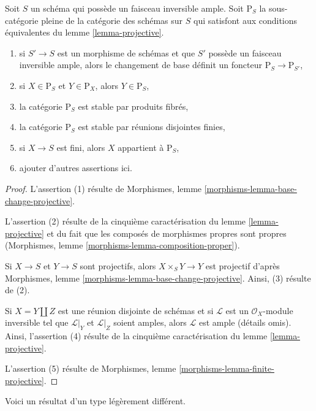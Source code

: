 \begin{lemma}
\label{lemma-category-projective}
Soit $S$ un schéma qui possède un faisceau inversible ample.
Soit $\text{P}_S$ la sous-catégorie pleine de la
catégorie des schémas sur $S$ qui satisfont aux conditions
équivalentes du lemme \ref{lemma-projective}.
\begin{enumerate}
\item si $S' \to S$ est un morphisme de schémas et que $S'$ possède
un faisceau inversible ample, alors le changement de base définit
un foncteur $\text{P}_S \to \text{P}_{S'}$,
\item si $X \in \text{P}_S$ et $Y \in \text{P}_X$, alors $Y \in \text{P}_S$,
\item la catégorie $\text{P}_S$ est stable par produits fibrés,
\item la catégorie $\text{P}_S$ est stable par
réunions disjointes finies,
\item si $X \to S$ est fini, alors $X$ appartient à $\text{P}_S$,
\item ajouter d'autres assertions ici.
\end{enumerate}
\end{lemma}

\begin{proof}
L'assertion (1) résulte de Morphismes, lemme
\ref{morphisms-lemma-base-change-projective}.

\medskip\noindent
L'assertion (2) résulte de la cinquième caractérisation du
lemme \ref{lemma-projective} et du fait que les composés
de morphismes propres sont propres
(Morphismes, lemme \ref{morphisms-lemma-composition-proper}).

\medskip\noindent
Si $X \to S$ et $Y \to S$ sont projectifs, alors
$X \times_S Y \to Y$ est projectif d'après
Morphismes, lemme \ref{morphisms-lemma-base-change-projective}.
Ainsi, (3) résulte de (2).

\medskip\noindent
Si $X = Y \amalg Z$ est une réunion disjointe de schémas
et si $\mathcal{L}$ est un $\mathcal{O}_X$-module inversible
tel que $\mathcal{L}|_Y$ et $\mathcal{L}|_Z$ soient amples, alors
$\mathcal{L}$ est ample (détails omis). Ainsi,
l'assertion (4) résulte de la cinquième caractérisation du
lemme \ref{lemma-projective}.

\medskip\noindent
L'assertion (5) résulte de
Morphismes, lemme \ref{morphisms-lemma-finite-projective}.
\end{proof}

\noindent
Voici un résultat d'un type légèrement différent.

